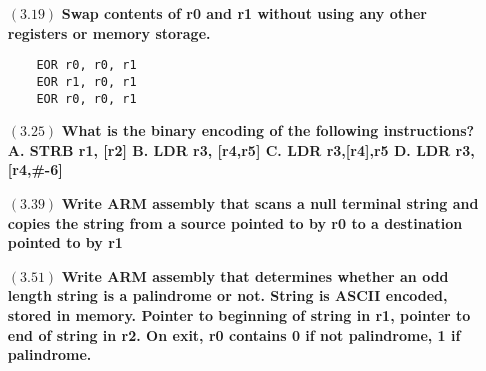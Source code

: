 \documentclass[letterpaper,10pt,titlepage]{article}
\def\braces#1{[#1]}
\begin{document}
\begin{enumerate}
\item[$(3.19)$] \textbf{Swap contents of r0 and r1 without using any other registers or memory storage.}

\begin{verbatim}
	EOR	r0, r0, r1
	EOR	r1, r0, r1
	EOR	r0, r0, r1
\end{verbatim}


\item[$(3.25)$] \textbf{What is the binary encoding of the following instructions? A. STRB r1, \braces{r2} B. LDR r3, \braces{r4,r5}\! C. LDR r3,\braces{r4},r5 D. LDR r3, \braces{r4,\#-6}\!}

\item[$(3.39)$] \textbf{Write ARM assembly that scans a null terminal string and copies the string from a source pointed to by r0 to a destination pointed to by r1}



\item[$(3.51)$] \textbf{Write ARM assembly that determines whether an odd length string is a palindrome or not. String is ASCII encoded, stored in memory. Pointer to beginning of string in r1, pointer to end of string in r2. On exit, r0 contains 0 if not palindrome, 1 if palindrome.}



\end{enumerate}
\end{document}
